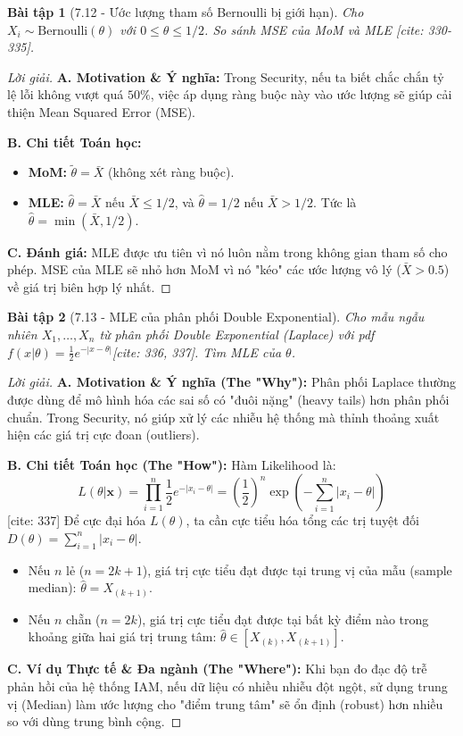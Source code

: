 \documentclass[8pt,a4paper]{article}
\newtheorem{exercise}{Bài tập}
\newenvironment{solution}{\begin{proof}[Lời giải]}{\end{proof}}
\begin{document}
\begin{exercise}[7.12 - Ước lượng tham số Bernoulli bị giới hạn]
Cho $X_i \sim \text{Bernoulli}(\theta)$ với $0 \le \theta \le 1/2$. So sánh MSE của MoM và MLE [cite: 330-335].
\end{exercise}

\begin{solution}
\textbf{A. Motivation \& Ý nghĩa:} Trong Security, nếu ta biết chắc chắn tỷ lệ lỗi không vượt quá $50\%$, việc áp dụng ràng buộc này vào ước lượng sẽ giúp cải thiện Mean Squared Error (MSE).

\textbf{B. Chi tiết Toán học:}
\begin{itemize}
    \item \textbf{MoM:} $\tilde{\theta} = \bar{X}$ (không xét ràng buộc).
    \item \textbf{MLE:} $\hat{\theta} = \bar{X}$ nếu $\bar{X} \le 1/2$, và $\hat{\theta} = 1/2$ nếu $\bar{X} > 1/2$. Tức là $\hat{\theta} = \min(\bar{X}, 1/2)$.
\end{itemize}
\textbf{C. Đánh giá:} MLE được ưu tiên vì nó luôn nằm trong không gian tham số cho phép. MSE của MLE sẽ nhỏ hơn MoM vì nó "kéo" các ước lượng vô lý ($\bar{X} > 0.5$) về giá trị biên hợp lý nhất.
\end{solution}


\begin{exercise}[7.13 - MLE của phân phối Double Exponential]
Cho mẫu ngẫu nhiên $X_1, \dots, X_n$ từ phân phối Double Exponential (Laplace) với pdf $f(x|\theta) = \frac{1}{2}e^{-|x-\theta|}$[cite: 336, 337]. Tìm MLE của $\theta$.
\end{exercise}

\begin{solution}
\textbf{A. Motivation \& Ý nghĩa (The "Why"):} Phân phối Laplace thường được dùng để mô hình hóa các sai số có "đuôi nặng" (heavy tails) hơn phân phối chuẩn. Trong Security, nó giúp xử lý các nhiễu hệ thống mà thỉnh thoảng xuất hiện các giá trị cực đoan (outliers).

\textbf{B. Chi tiết Toán học (The "How"):}
Hàm Likelihood là:
\[ L(\theta | \mathbf{x}) = \prod_{i=1}^n \frac{1}{2}e^{-|x_i-\theta|} = \left(\frac{1}{2}\right)^n \exp\left( -\sum_{i=1}^n |x_i - \theta| \right) \] [cite: 337]
Để cực đại hóa $L(\theta)$, ta cần cực tiểu hóa tổng các trị tuyệt đối $D(\theta) = \sum_{i=1}^n |x_i - \theta|$.
\begin{itemize}
    \item Nếu $n$ lẻ ($n=2k+1$), giá trị cực tiểu đạt được tại trung vị của mẫu (sample median): $\hat{\theta} = X_{(k+1)}$.
    \item Nếu $n$ chẵn ($n=2k$), giá trị cực tiểu đạt được tại bất kỳ điểm nào trong khoảng giữa hai giá trị trung tâm: $\hat{\theta} \in [X_{(k)}, X_{(k+1)}]$.
\end{itemize}

\textbf{C. Ví dụ Thực tế \& Đa ngành (The "Where"):} Khi bạn đo đạc độ trễ phản hồi của hệ thống IAM, nếu dữ liệu có nhiều nhiễu đột ngột, sử dụng trung vị (Median) làm ước lượng cho "điểm trung tâm" sẽ ổn định (robust) hơn nhiều so với dùng trung bình cộng.
\end{solution}
\end{document}
